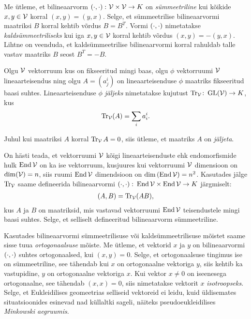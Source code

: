 Me ütleme, et bilineaarvorm $\left( \cdot, \cdot \right) \colon \mathcal{V} \times \mathcal{V} \to K$ on
\emph{sümmeetriline} kui
kõikide $x, y \in \mathcal{V}$ korral $(x, y) = (y, x)$. Selge, et sümmeetrilise
bilineaarvormi maatriksi $B$ korral kehtib võrdus $B = B^T$. Vormi $\left( \cdot, \cdot \right)$
nimetatakse \emph{kaldsümmeetriliseks} kui iga $x, y \in \mathcal{V}$ korral kehtib
võrdus $(x, y) = - (y, x)$. Lihtne on veenduda, et kaldsümmeetrilise
bilineaarvormi korral rahuldab talle vastav maatriks $B$ seost
$B^T = -B$.

\begin{dfn}
    Olgu $\mathcal{V}$ vektorruum kus on fikseeritud mingi baas, olgu $\phi$
    vektorruumi $\mathcal{V}$ lineaarteisendus ning olgu $A = (a^i_j)$ on
    lineaarteisenduse $\phi$ maatriks fikseeritud baasi suhtes.
    Lineaarteisenduse $\phi$ \emph{jäljeks} nimetatakse kujutust
    $\operatorname{Tr}_{\mathcal{V}} \colon \operatorname{GL}(\mathcal{V}) \to K$, kus
    \begin{align*}
        \operatorname{Tr}_{\mathcal{V}}(A) = \sum_i a^i_i.
    \end{align*}
\end{dfn}

Juhul kui maatriksi $A$ korral $\operatorname{Tr}_{\mathcal{V}} A = 0$, siis ütleme, et
maatriks $A$ on \emph{jäljeta}.

\begin{naide}
    On hästi teada, et vektorruumi $\mathcal{V}$ kõigi lineaarteisenduste ehk
    endomorfismide hulk $\operatorname{End} \mathcal{V}$
    on ka ise vektorruum, kusjuures kui vektorruumi $\mathcal{V}$ dimensioon
    on $\dim(\mathcal{V}) = n$, siis ruumi $\operatorname{End} \mathcal{V}$ dimendsioon on
    $\dim \left(\operatorname{End} \mathcal{V}\right) = n^2$. Kasutades jälge $\operatorname{Tr}_{\mathcal{V}}$ saame
    defineerida bilineaarvormi
    $\left( \cdot, \cdot \right) \colon \operatorname{End} \mathcal{V} \times \operatorname{End} \mathcal{V} \to K$ järgmiselt:
    \begin{align*}
        (A, B) = \operatorname{Tr}_{\mathcal{V}}(AB),
    \end{align*}
    kus $A$ ja $B$ on maatriksid, mis vastavad vektorruumi $\operatorname{End} \mathcal{V}$
    teisendustele mingi baasi suhtes. Selge, et selliselt defineeritud
    bilineaarvorm sümmeetriline.
\end{naide}

Kasutades bilineaarvormi sümmeetrilisuse või kaldsümmeetrilisuse mõistet
saame sisse tuua \emph{ortogonaalsuse} mõiste. Me ütleme, et vektorid $x$ ja
$y$ on bilineaarvormi $\left( \cdot, \cdot \right)$ suhtes ortogonaalsed, kui $(x, y) = 0$. Selge,
et ortogonaalsuse tingimus ise on sümmeetriline, see tähendab kui $x$ on
ortogonaalne vektoriga $y$, siis kehtib ka vastupidine, $y$ on ortogonaalne
vektoriga $x$. Kui vektor $x \neq 0$ on iseenesega ortogonaalne, see tähendab
$(x, x) = 0$, siis nimetatakse vektorit $x$ \emph{isotroopseks}. Selge, et
Eukleidilises geomeetrias selliseid vektoreid ei leidu, kuid üldisemates
situatsioonides esinevad nad küllaltki sageli, näiteks pseudoeukleidilises
\emph{Minkowski aegruumis}.


